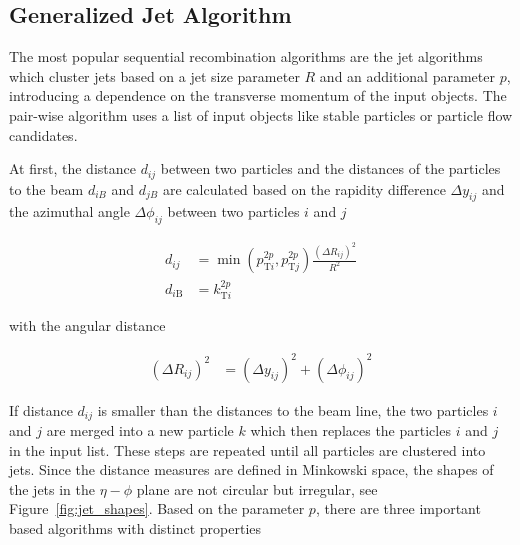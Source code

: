 \subsection{Generalized \kt Jet Algorithm}

The most popular sequential recombination algorithms are the \kt jet
algorithms which cluster jets based on a jet size parameter $R$ and an
additional parameter $p$, introducing a dependence on the transverse momentum of
the input objects. The pair-wise algorithm uses a list of input objects like stable
particles or particle flow candidates. 

At first, the distance $d_{ij}$ between two particles and the distances of the
particles to the beam $d_{iB}$ and $d_{jB}$ are calculated based on the rapidity
difference $\Delta y_{ij}$ and the azimuthal angle $\Delta \phi_{ij}$ between two
particles $i$ and $j$

\begin{align*} 
    d_{ij} &= \min(p_{\mathrm{T}i}^{2p},p_{\mathrm{T}j}^{2p})\frac{\left(\Delta
        R_{ij}\right)^2}{R^2}\\
    d_{i\mathrm{B}} &= k_{\mathrm{T}i}^{2p}
\end{align*} 

with the angular distance

\begin{align*}
    \left(\Delta R_{ij}\right)^2 &= (\Delta y_{ij})^2 + (\Delta \phi_{ij})^2
\end{align*} 

If distance $d_{ij}$ is smaller than the distances to the beam line, the two
particles $i$ and $j$ are merged into a new particle $k$ which then replaces the
particles $i$ and $j$ in the input list. These steps are repeated until all
particles are clustered into jets. Since the distance measures are defined in
Minkowski space, the shapes of the jets in the $\eta-\phi$ plane are not circular but
irregular, see Figure~\ref{fig:jet_shapes}. Based on the parameter $p$, there
are three important \kt based algorithms with distinct properties

